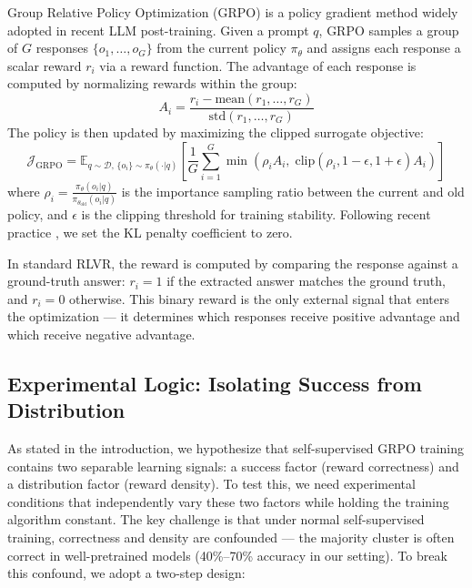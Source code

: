 \documentclass{article}
\begin{document}
Group Relative Policy Optimization (GRPO) \cite{shao2024deepseekmath,guo2025deepseek} is a policy gradient method widely adopted in recent LLM post-training. Given a prompt $q$, GRPO samples a group of $G$ responses $\{o_1, \ldots, o_G\}$ from the current policy $\pi_\theta$ and assigns each response a scalar reward $r_i$ via a reward function. The advantage of each response is computed by normalizing rewards within the group:
\begin{equation}
A_i = \frac{r_i - \text{mean}(r_1, \ldots, r_G)}{\text{std}(r_1, \ldots, r_G)}
\end{equation}
The policy is then updated by maximizing the clipped surrogate objective:
\begin{equation}
\mathcal{J}_{\text{GRPO}} = \mathbb{E}_{q \sim \mathcal{D},\, \{o_i\} \sim \pi_\theta(\cdot|q)} \left[ \frac{1}{G} \sum_{i=1}^{G} \min\left(\rho_i A_i,\; \text{clip}(\rho_i, 1-\epsilon, 1+\epsilon) A_i \right) \right]
\end{equation}
where $\rho_i = \frac{\pi_\theta(o_i|q)}{\pi_{\theta_{\text{old}}}(o_i|q)}$ is the importance sampling ratio between the current and old policy, and $\epsilon$ is the clipping threshold for training stability. Following recent practice \cite{zhangright,zuottrl}, we set the KL penalty coefficient to zero.

In standard RLVR, the reward is computed by comparing the response against a ground-truth answer: $r_i = 1$ if the extracted answer matches the ground truth, and $r_i = 0$ otherwise. This binary reward is the only external signal that enters the optimization --- it determines which responses receive positive advantage and which receive negative advantage.


\subsection{Experimental Logic: Isolating Success from Distribution}

As stated in the introduction, we hypothesize that self-supervised GRPO training contains two separable learning signals: a success factor (reward correctness) and a distribution factor (reward density). To test this, we need experimental conditions that independently vary these two factors while holding the training algorithm constant. The key challenge is that under normal self-supervised training, correctness and density are confounded --- the majority cluster is often correct in well-pretrained models (40\%--70\% accuracy in our setting). To break this confound, we adopt a two-step design:
\end{document}
